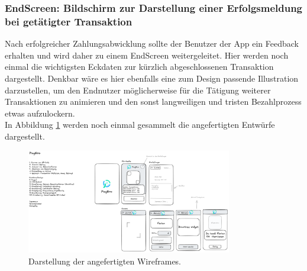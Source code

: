   \subsubsection*{EndScreen: Bildschirm zur Darstellung einer Erfolgsmeldung bei getätigter Transaktion}
  Nach erfolgreicher Zahlungsabwicklung sollte der Benutzer der App ein Feedback erhalten und wird daher zu einem EndScreen weitergeleitet.
  Hier werden noch einmal die wichtigsten Eckdaten zur kürzlich abgeschlossenen Transaktion dargestellt.
  Denkbar wäre es hier ebenfalls eine zum Design passende Illustration darzustellen, um den Endnutzer möglicherweise für die Tätigung weiterer Transaktionen zu animieren und den sonst langweiligen und tristen Bezahlprozess etwas aufzulockern.
  \\
  In Abbildung \ref{fig:wireframes} werden noch einmal gesammelt die angefertigten Entwürfe dargestellt.
  
  \begin{figure}[H]
    \centering
    \includegraphics[width=0.8\textwidth]{images/wireframes.png}
    \caption{Darstellung der angefertigten Wireframes.}
    \label{fig:wireframes}
  \end{figure}